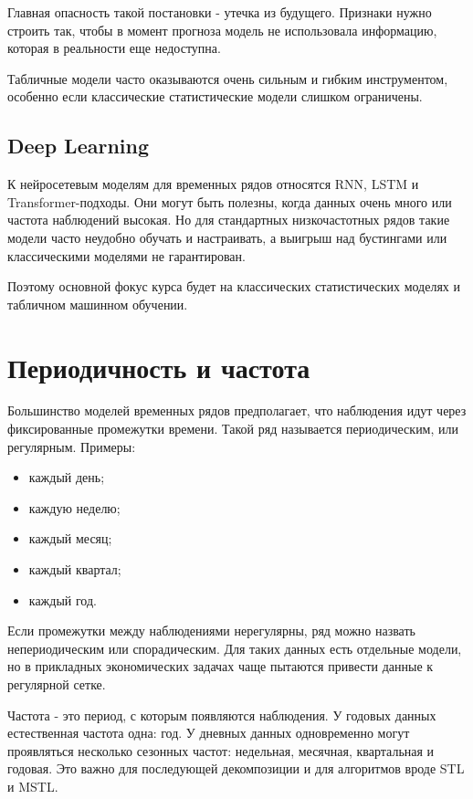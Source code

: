 \documentclass[12pt,fleqn]{article}
\begin{document}
Главная опасность такой постановки - утечка из будущего.
Признаки нужно строить так, чтобы в момент прогноза модель не использовала информацию, которая в реальности еще недоступна.

Табличные модели часто оказываются очень сильным и гибким инструментом, особенно если классические статистические модели слишком ограничены.


\subsection{Deep Learning}


К нейросетевым моделям для временных рядов относятся RNN, LSTM и Transformer-подходы.
Они могут быть полезны, когда данных очень много или частота наблюдений высокая.
Но для стандартных низкочастотных рядов такие модели часто неудобно обучать и настраивать, а выигрыш над бустингами или классическими моделями не гарантирован.

Поэтому основной фокус курса будет на классических статистических моделях и табличном машинном обучении.


\section{Периодичность и частота}


Большинство моделей временных рядов предполагает, что наблюдения идут через фиксированные промежутки времени.
Такой ряд называется периодическим, или регулярным.
Примеры:

\begin{itemize}
  \item каждый день;
  \item каждую неделю;
  \item каждый месяц;
  \item каждый квартал;
  \item каждый год.
\end{itemize}

Если промежутки между наблюдениями нерегулярны, ряд можно назвать непериодическим или спорадическим.
Для таких данных есть отдельные модели, но в прикладных экономических задачах чаще пытаются привести данные к регулярной сетке.

Частота - это период, с которым появляются наблюдения.
У годовых данных естественная частота одна: год.
У дневных данных одновременно могут проявляться несколько сезонных частот: недельная, месячная, квартальная и годовая.
Это важно для последующей декомпозиции и для алгоритмов вроде STL и MSTL.
\newpage
\end{document}
